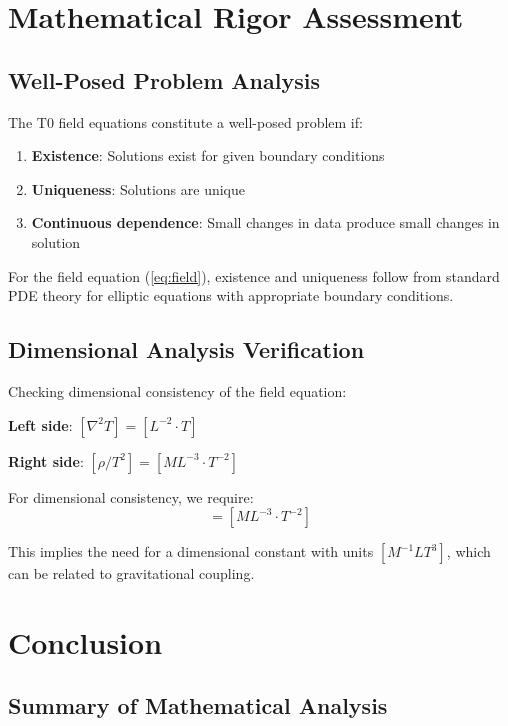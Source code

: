 \documentclass[12pt,a4paper]{article}
\begin{document}
	\section{Mathematical Rigor Assessment}
	
	\subsection{Well-Posed Problem Analysis}
	
	The T0 field equations constitute a well-posed problem if:
	
	\begin{enumerate}
		\item \textbf{Existence}: Solutions exist for given boundary conditions
		\item \textbf{Uniqueness}: Solutions are unique
		\item \textbf{Continuous dependence}: Small changes in data produce small changes in solution
	\end{enumerate}
	
	For the field equation (\ref{eq:field}), existence and uniqueness follow from standard PDE theory for elliptic equations with appropriate boundary conditions.
	
	\subsection{Dimensional Analysis Verification}
	
	Checking dimensional consistency of the field equation:
	
	\textbf{Left side}: $[\nabla^2 T] = [L^{-2} \cdot T]$
	
	\textbf{Right side}: $[\rho/T^2] = [M L^{-3} \cdot T^{-2}]$
	
	For dimensional consistency, we require:
	\begin{equation}
		[L^{-2} \cdot T] = [M L^{-3} \cdot T^{-2}]
	\end{equation}
	
	This implies the need for a dimensional constant with units $[M^{-1} L T^3]$, which can be related to gravitational coupling.
	
	\section{Conclusion}
	
	\subsection{Summary of Mathematical Analysis}
	
\end{document}
